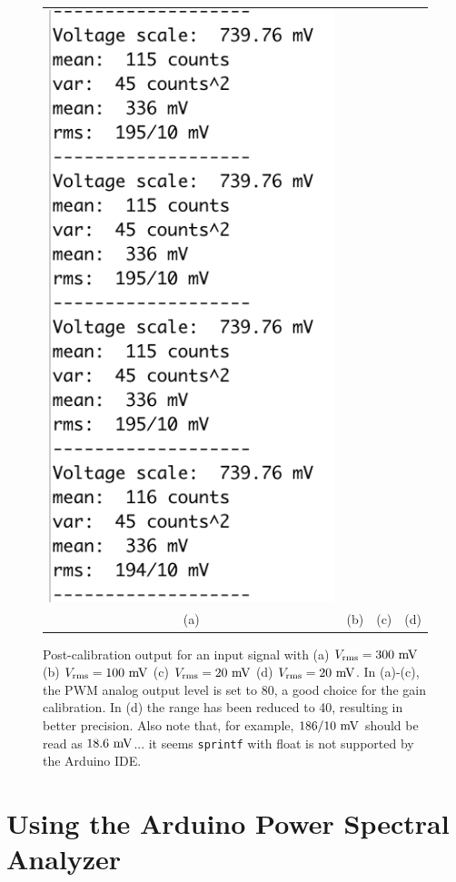 \documentclass[12pt]{article}
\begin{document}
\begin{figure}[htbp]
\begin{center}
\begin{tabular}{cccc}
{\includegraphics[height=0.30\textheight]{figs/calibd.png}} \\
(a) & (b) & (c) & (d) \\
\end{tabular}
\end{center}
\caption{\label{fig:calib}   Post-calibration output for an input signal with (a) $V_{\rm rms}=300~\rm mV$ (b) $V_{\rm rms}=100~\rm mV$ (c) $V_{\rm rms}=20~\rm mV$ (d) $V_{\rm rms}=20~\rm mV$.  In (a)-(c), the PWM analog output level is set to 80, a good choice for the gain calibration.  In (d) the range has been reduced to 40, resulting in better precision.  Also note that, for example, $186/10~\rm mV$ should be read as $18.6~\rm mV$... it seems {\tt sprintf} with float is not supported by the Arduino IDE.}
\end{figure}

\section{Using the Arduino Power Spectral Analyzer}
\end{document}
